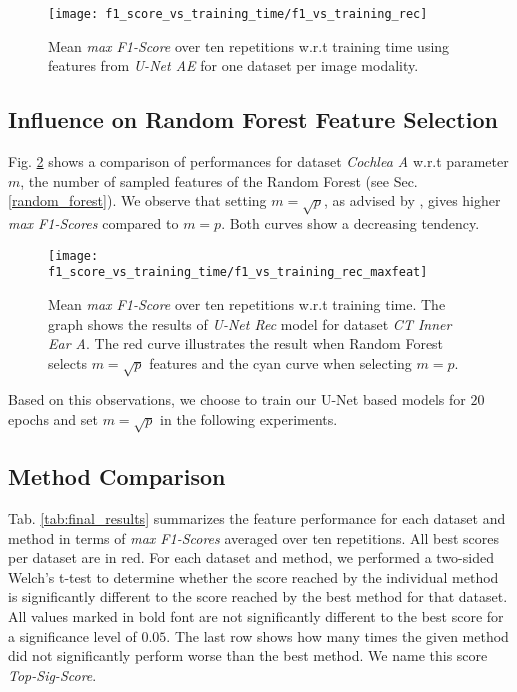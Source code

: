 \begin{figure}[!htbp]
  \centering
  {
    \texttt{[image: f1\_score\_vs\_training\_time/f1\_vs\_training\_rec]}
  }
  \caption[Feature quality vs training time of U-Net Rec model]{Mean \textit{max F1-Score} over ten repetitions w.r.t training time using features from \textit{U-Net AE} for one dataset per image modality.}
  \label{fig:perf_vs_training}
\end{figure}

\clearpage
\subsection{Influence on Random Forest Feature Selection} \label{sec:infl_feat_selection}
Fig. \ref{fig:perf_vs_training_maxfeat} shows a comparison of performances for dataset \textit{Cochlea A} w.r.t parameter $m$, the number of sampled features of the Random Forest (see Sec. \ref{random_forest}).
We observe that setting $m=\sqrt{p}$, as advised by \cite[Ch. 15]{hastie09}, gives higher \textit{max F1-Scores} compared to $m=p$.
Both curves show a decreasing tendency.
\vspace{10pt}

\begin{figure}[!htbp]
  \centering
  {
    \texttt{[image: f1\_score\_vs\_training\_time/f1\_vs\_training\_rec\_maxfeat]}
  }
  \caption[Feature quality vs training time of U-Net Rec model]{Mean \textit{max F1-Score} over ten repetitions w.r.t training time. The graph shows the results of \textit{U-Net Rec} model for dataset \textit{CT Inner Ear A}. The red curve illustrates the result when Random Forest selects $m=\sqrt{p}$ features and the cyan curve when selecting $m=p$.}
  \label{fig:perf_vs_training_maxfeat}
\end{figure}

Based on this observations, we choose to train our U-Net based models for $20$ epochs and set $m=\sqrt{p}$ in the following experiments.
\vspace{20pt}

\subsection{Method Comparison}
Tab. \ref{tab:final_results} summarizes the feature performance for each dataset and method in terms of \textit{max F1-Scores} averaged over ten repetitions.
All best scores per dataset are in red.
For each dataset and method, we performed a two-sided Welch's t-test \cite{welch1947} to determine whether the score reached by the individual method is significantly different to the score reached by the best method for that dataset.
All values marked in bold font are not significantly different to the best score for a significance level of $0.05$.
The last row shows how many times the given method did not significantly perform worse than the best method.
We name this score \textit{Top-Sig-Score}.

